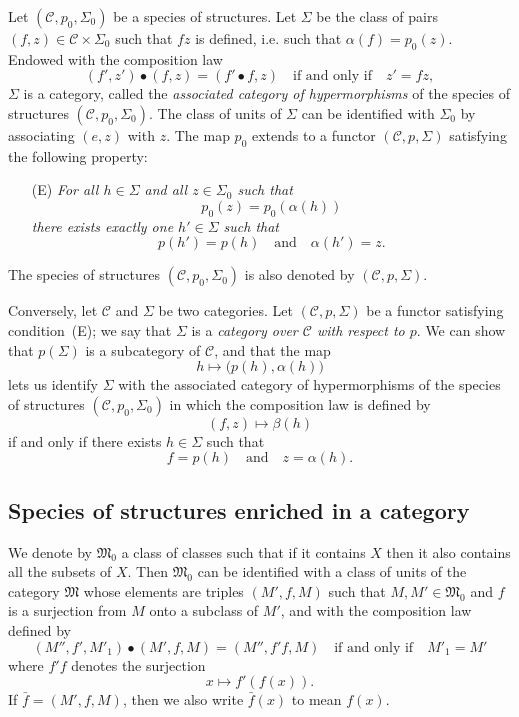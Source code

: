 \documentclass[a4paper,oneside,nobib,nofonts,notitlepage,notoc,nols,fleqn,justified]{tufte-book}
\newcommand{\oldpage}[1]{{\reversemarginpar\marginnote{\raggedleft\footnotesize\textit{p.~#1}}}}
\newcommand{\CC}{\mathcal{C}}
\newcommand{\MM}{\mathfrak{M}}
\begin{document}
Let $(\CC,p_0,\Sigma_0)$ be a species of structures.
Let $\Sigma$ be the class of pairs $(f,z)\in\CC\times\Sigma_0$ such that $fz$ is defined, i.e. such that $\alpha(f)=p_0(z)$.
Endowed with the composition law
\[
  (f',z')\bullet(f,z)
  = (f'\bullet f,z)
  \quad\text{if and only if}\quad
  z'=fz,
\]
\oldpage{352}
$\Sigma$ is a category, called the \emph{associated category of hypermorphisms} of the species of structures $(\CC,p_0,\Sigma_0)$.
The class of units of $\Sigma$ can be identified with $\Sigma_0$ by associating $(e,z)$ with $z$.
The map $p_0$ extends to a functor $(\CC,p,\Sigma)$ satisfying the following property:
\begin{enumerate}
  \item[\normalfont(E)] \itshape
    For all $h\in\Sigma$ and all $z\in\Sigma_0$ such that
    \[
      p_0(z)
      = p_0(\alpha(h))
    \]
    there exists exactly one $h'\in\Sigma$ such that
    \[
      p(h')=p(h)
      \quad\text{and}\quad
      \alpha(h')=z.
    \]
\end{enumerate}
The species of structures $(\CC,p_0,\Sigma_0)$ is also denoted by $(\CC,p,\Sigma)$.

Conversely, let $\CC$ and $\Sigma$ be two categories.
Let $(\CC,p,\Sigma)$ be a functor satisfying condition~(E);
we say that $\Sigma$ is a \emph{category over $\CC$ with respect to $p$}.
We can show \cite{3a} that $p(\Sigma)$ is a subcategory of $\CC$, and that the map
\[
  h\longmapsto \big(p(h),\alpha(h)\big)
\]
lets us identify $\Sigma$ with the associated category of hypermorphisms of the species of structures $(\CC,p_0,\Sigma_0)$ in which the composition law is defined by
\[
  (f,z) \longmapsto \beta(h)
\]
if and only if there exists $h\in\Sigma$ such that
\[
  f=p(h)
  \quad\text{and}\quad
  z=\alpha(h).
\]



\subsection{Species of structures enriched in a category}
\label{section:i.3}

We denote by $\MM_0$ a class of classes such that if it contains $X$ then it also contains all the subsets of $X$.
Then $\MM_0$ can be identified with a class of units of the category $\MM$ whose elements are triples $(M',f,M)$ such that $M,M'\in\MM_0$ and $f$ is a surjection from $M$ onto a subclass of $M'$, and with the composition law defined by
\[
  (M'',f',M'_1)\bullet(M',f,M)
  = (M'',f'f,M)
  \quad\text{if and only if}\quad
  M'_1=M'
\]
where $f'f$ denotes the surjection
\[
  x\longmapsto f'(f(x)).
\]
If $\bar{f}=(M',f,M)$, then we also write $\bar{f}(x)$ to mean $f(x)$.
\end{document}
